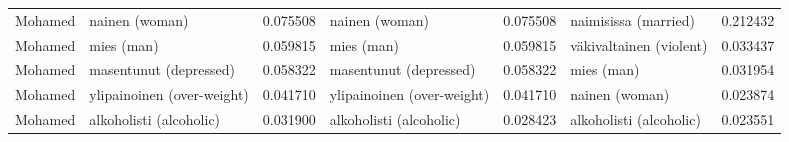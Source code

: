 \begin{tabular}{llrlrlr}
Mohamed &                nainen (woman) &                         0.075508 &                nainen (woman) &                              0.075508 &       naimisissa (married) &                        0.212432 \\
Mohamed &                    mies (man) &                         0.059815 &                    mies (man) &                              0.059815 &    väkivaltainen (violent) &                        0.033437 \\
Mohamed &        masentunut (depressed) &                         0.058322 &        masentunut (depressed) &                              0.058322 &                 mies (man) &                        0.031954 \\
Mohamed &    ylipainoinen (over-weight) &                         0.041710 &    ylipainoinen (over-weight) &                              0.041710 &             nainen (woman) &                        0.023874 \\
Mohamed &       alkoholisti (alcoholic) &                         0.031900 &       alkoholisti (alcoholic) &                              0.028423 &    alkoholisti (alcoholic) &                        0.023551 \\
\bottomrule
\end{tabular}
